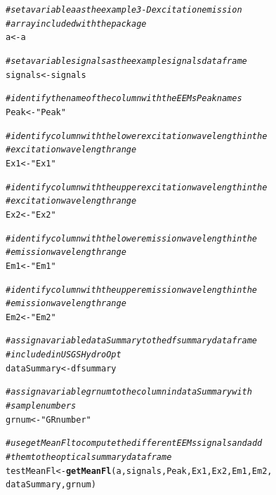 \documentclass[a4paper,11pt]{article}\usepackage[]{graphicx}\usepackage[]{color}
\makeatletter
\newcommand{\hlstr}[1]{\textcolor[rgb]{0.192,0.494,0.8}{#1}}%
\newcommand{\hlcom}[1]{\textcolor[rgb]{0.678,0.584,0.686}{\textit{#1}}}%
\newcommand{\hlstd}[1]{\textcolor[rgb]{0.345,0.345,0.345}{#1}}%
\newcommand{\hlkwb}[1]{\textcolor[rgb]{0.69,0.353,0.396}{#1}}%
\newcommand{\hlkwd}[1]{\textcolor[rgb]{0.737,0.353,0.396}{\textbf{#1}}}%
\newenvironment{kframe}{%
 \def\at@end@of@kframe{}%
 \ifinner\ifhmode%
  \def\at@end@of@kframe{\end{minipage}}%
  \begin{minipage}{\columnwidth}%
 \fi\fi%
 \def\FrameCommand##1{\hskip\@totalleftmargin \hskip-\fboxsep
 \colorbox{shadecolor}{##1}\hskip-\fboxsep
     \hskip-\linewidth \hskip-\@totalleftmargin \hskip\columnwidth}%
 \MakeFramed {\advance\hsize-\width
   \@totalleftmargin\z@ \linewidth\hsize
   \@setminipage}}%
 {\par\unskip\endMakeFramed%
 \at@end@of@kframe}
\newenvironment{knitrout}{}{} %
\makeatother
\begin{document}
\begin{knitrout}
\color{fgcolor}\begin{kframe}
\begin{alltt}
\hlcom{# set a variable a as the example 3-D excitation emission}
\hlcom{# array included with the package}
\hlstd{a} \hlkwb{<-} \hlstd{a}

\hlcom{# set a variable signals as the example signals dataframe}
\hlstd{signals} \hlkwb{<-} \hlstd{signals}

\hlcom{# identify the name of the column with the EEMs Peak names}
\hlstd{Peak} \hlkwb{<-} \hlstr{"Peak"}

\hlcom{# identify column with the lower excitation wavelength in the}
\hlcom{# excitation wavelength range}
\hlstd{Ex1} \hlkwb{<-} \hlstr{"Ex1"}

\hlcom{# identify column with the upper excitation wavelength in the}
\hlcom{# excitation wavelength range}
\hlstd{Ex2} \hlkwb{<-} \hlstr{"Ex2"}

\hlcom{# identify column with the lower emission wavelength in the}
\hlcom{# emission wavelength range}
\hlstd{Em1} \hlkwb{<-} \hlstr{"Em1"}

\hlcom{# identify column with the upper emission wavelength in the}
\hlcom{# emission wavelength range}
\hlstd{Em2} \hlkwb{<-} \hlstr{"Em2"}

\hlcom{# assign a variable dataSummary to the dfsummary dataframe}
\hlcom{# included in USGSHydroOpt}
\hlstd{dataSummary} \hlkwb{<-} \hlstd{dfsummary}

\hlcom{# assign a variable grnum to the column in dataSummary with}
\hlcom{# sample numbers}
\hlstd{grnum} \hlkwb{<-} \hlstr{"GRnumber"}

\hlcom{# use getMeanFl to compute the different EEMs signals and add}
\hlcom{# them to the optical summary data frame}
\hlstd{testMeanFl} \hlkwb{<-} \hlkwd{getMeanFl}\hlstd{(a, signals, Peak, Ex1, Ex2, Em1, Em2,}
    \hlstd{dataSummary, grnum)}
\end{alltt}
\end{kframe}
\end{knitrout}

\end{document}
